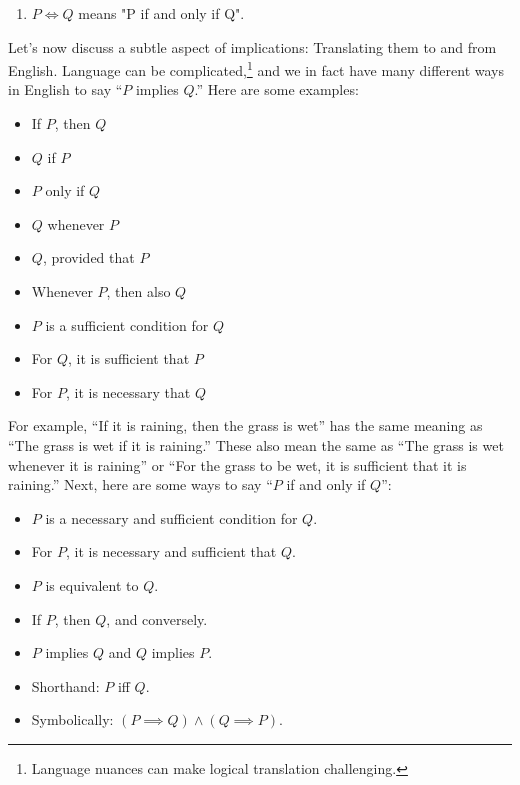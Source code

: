 \documentclass{report}
\begin{document}
\begin{itemize}
\begin{enumerate}
                \item $P \iff Q$ means "P if and only if Q".
            \end{enumerate}
            \bigbreak \noindent 
            Let’s now discuss a subtle aspect of implications: Translating them to and from English. Language can be complicated,\footnote{Language nuances can make logical translation challenging.} and we in fact have many different ways in English to say “$P$ implies $Q$.” Here are some examples:
            \begin{itemize}
                \item If $P$, then $Q$
                \item $Q$ if $P$
                \item $P$ only if $Q$
                \item $Q$ whenever $P$
                \item $Q$, provided that $P$
                \item Whenever $P$, then also $Q$
                \item $P$ is a sufficient condition for $Q$
                \item For $Q$, it is sufficient that $P$
                \item For $P$, it is necessary that $Q$
            \end{itemize}
            For example, “If it is raining, then the grass is wet” has the same meaning as “The grass is wet if it is raining.” These also mean the same as “The grass is wet whenever it is raining” or “For the grass to be wet, it is sufficient that it is raining.”
            \bigbreak \noindent 
            Next, here are some ways to say “$P$ if and only if $Q$”:
            \begin{itemize}
                \item $P$ is a necessary and sufficient condition for $Q$.
                \item For $P$, it is necessary and sufficient that $Q$.
                \item $P$ is equivalent to $Q$.
                \item If $P$, then $Q$, and conversely.
                \item $P$ implies $Q$ and $Q$ implies $P$.
                \item Shorthand: $P$ iff $Q$.
                \item Symbolically: $(P \implies Q) \land (Q \implies P)$.
            \end{itemize}

\end{itemize}
\end{document}
